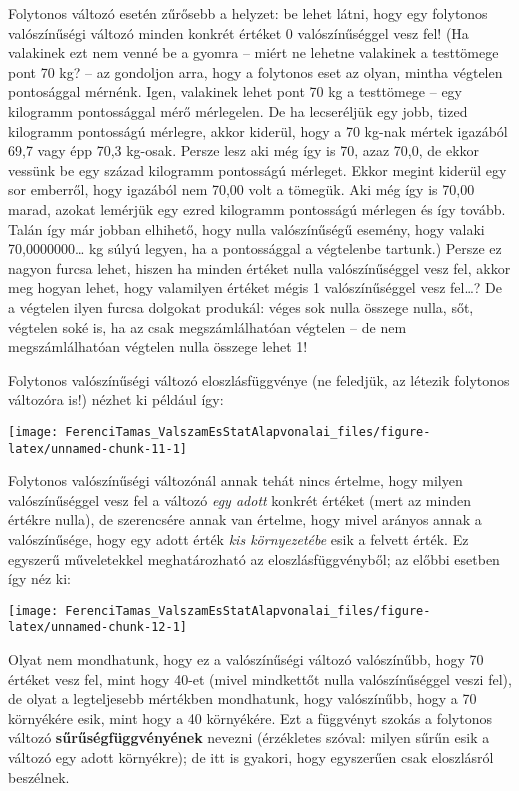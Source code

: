 \documentclass[magyar,]{book}
\begin{document}
Folytonos változó esetén zűrősebb a helyzet: be lehet látni, hogy egy folytonos valószínűségi változó minden konkrét értéket 0 valószínűséggel vesz fel! (Ha valakinek ezt nem venné be a gyomra -- miért ne lehetne valakinek a testtömege pont 70 kg? -- az gondoljon arra, hogy a folytonos eset az olyan, mintha végtelen pontosággal mérnénk. Igen, valakinek lehet pont 70 kg a testtömege -- egy kilogramm pontossággal mérő mérlegelen. De ha lecseréljük egy jobb, tized kilogramm pontosságú mérlegre, akkor kiderül, hogy a 70 kg-nak mértek igazából 69,7 vagy épp 70,3 kg-osak. Persze lesz aki még így is 70, azaz 70,0, de ekkor vessünk be egy század kilogramm pontosságú mérleget. Ekkor megint kiderül egy sor emberről, hogy igazából nem 70,00 volt a tömegük. Aki még így is 70,00 marad, azokat lemérjük egy ezred kilogramm pontosságú mérlegen és így tovább. Talán így már jobban elhihető, hogy nulla valószínűségű esemény, hogy valaki 70,0000000\ldots{} kg súlyú legyen, ha a pontossággal a végtelenbe tartunk.) Persze ez nagyon furcsa lehet, hiszen ha minden értéket nulla valószínűséggel vesz fel, akkor meg hogyan lehet, hogy valamilyen értéket mégis 1 valószínűséggel vesz fel\ldots? De a végtelen ilyen furcsa dolgokat produkál: véges sok nulla összege nulla, sőt, végtelen soké is, ha az csak megszámlálhatóan végtelen -- de nem megszámlálhatóan végtelen nulla összege lehet 1!

Folytonos valószínűségi változó eloszlásfüggvénye (ne feledjük, az létezik folytonos változóra is!) nézhet ki például így:

\begin{center}\texttt{[image: FerenciTamas\_ValszamEsStatAlapvonalai\_files/figure-latex/unnamed-chunk-11-1]} \end{center}

Folytonos valószínűségi változónál annak tehát nincs értelme, hogy milyen valószínűséggel vesz fel a változó \emph{egy adott} konkrét értéket (mert az minden értékre nulla), de szerencsére annak van értelme, hogy mivel arányos annak a valószínűsége, hogy egy adott érték \emph{kis környezetébe} esik a felvett érték. Ez egyszerű műveletekkel meghatározható az eloszlásfüggvényből; az előbbi esetben így néz ki:

\begin{center}\texttt{[image: FerenciTamas\_ValszamEsStatAlapvonalai\_files/figure-latex/unnamed-chunk-12-1]} \end{center}

Olyat nem mondhatunk, hogy ez a valószínűségi változó valószínűbb, hogy 70 értéket vesz fel, mint hogy 40-et (mivel mindkettőt nulla valószínűséggel veszi fel), de olyat a legteljesebb mértékben mondhatunk, hogy valószínűbb, hogy a 70 környékére esik, mint hogy a 40 környékére. Ezt a függvényt szokás a folytonos változó \textbf{sűrűségfüggvényének} nevezni (érzékletes szóval: milyen sűrűn esik a változó egy adott környékre); de itt is gyakori, hogy egyszerűen csak eloszlásról beszélnek.
\end{document}
